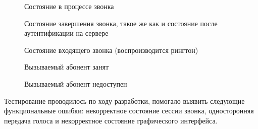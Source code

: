 \begin{figure}[h]
\caption{Состояние в процессе звонка}
\label{image:test4}
\end{figure}

\begin{figure}[h]
\caption{Состояние завершения звонка, такое же как и состояние после аутентификации на сервере}
\label{image:test5}
\end{figure}

\begin{figure}[h]
\caption{Состояние входящего звонка (воспроизводится рингтон)}
\label{image:test6}
\end{figure}

\begin{figure}[h]
\caption{Вызываемый абонент занят}
\label{image:test7}
\end{figure}

\begin{figure}[h]
\caption{Вызываемый абонент недоступен}
\label{image:test8}
\end{figure}

Тестирование проводилось по ходу разработки, помогало выявить следующие функциональные ошибки: некорректное состояние сессии звонка, односторонняя передача голоса и некорректное состояние графического интерфейса.

